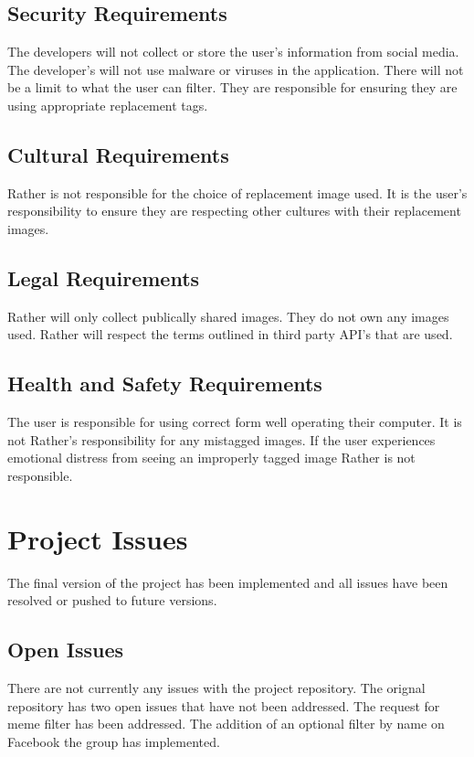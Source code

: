 \documentclass[12pt, titlepage]{article}
\begin{document}
\subsection{Security Requirements}
The developers will not collect or store the user's information from social media. The developer's will not use malware or viruses %
in the application. There will not be a limit to what the user can filter. They are responsible for ensuring they are using appropriate replacement tags. 

\subsection{Cultural Requirements}
Rather is not responsible for the choice of replacement image used. It is the user's responsibility to ensure they are respecting other cultures with their replacement images.

\subsection{Legal Requirements}
Rather will only collect publically shared images. They do not own any images used. Rather will respect the terms outlined in third party API's that are used.

\subsection{Health and Safety Requirements}
The user is responsible for using correct form well operating their computer. It is not Rather's responsibility for any mistagged images. If the user experiences emotional distress from seeing an improperly tagged image Rather is not responsible. 
\section{Project Issues}
The final version of the project has been implemented and all issues have been resolved or pushed to future versions.

\subsection{Open Issues}
There are not currently any issues with the project repository. The orignal repository has two open issues that have not been addressed. The request for meme filter has been addressed. The addition of an optional filter by name on Facebook the group has implemented. 
\end{document}
